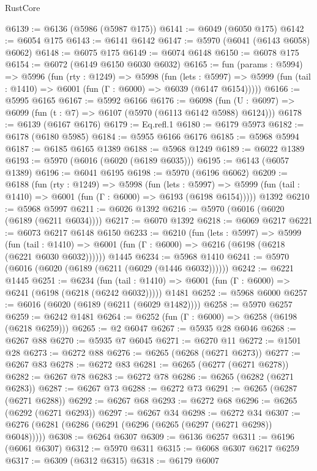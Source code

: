 \begin{lexlean}{RustCore}
\begin{coremodule}
@6139 := @6136 (@5986 (@5987 @175))
@6141 := @6049 (@6050 @175)
@6142 := @6054 @175
@6143 := @6141 @6142
@6147 := @5970 (@6041 (@6143 @6058) @6062)
@6148 := @6075 @175
@6149 := @6074 @6148
@6150 := @6078 @175
@6154 := @6072 (@6149 @6150 @6030 @6032)
@6165 := fun (params : @5994) =>
  @5996
    (fun (rty : @1249) =>
    @5998
      (fun (lets : @5997) =>
      @5999 (fun (tail : @1410) => @6001 (fun (Γ : @6000) => @6039 (@6147 @6154)))))
@6166 := @5995 @6165
@6167 := @5992 @6166
@6176 := @6098 (fun (U : @6097) => @6099 (fun (t : @7) => @6107 (@5970 (@6113 @6142 @5988) @6124)))
@6178 := @6139 (@6167 @6176)
@6179 := Eq.refl.{1}
@6180 := @6179 @5973
@6182 := @6178 (@6180 @5985)
@6184 := @5955 @6166 @6176
@6185 := @5968 @5994
@6187 := @6185 @6165 @1389
@6188 := @5968 @1249
@6189 := @6022 @1389
@6193 := @5970 (@6016 (@6020 (@6189 @6035)))
@6195 := @6143 (@6057 @1389)
@6196 := @6041 @6195
@6198 := @5970 (@6196 @6062)
@6209 := @6188
    (fun (rty : @1249) =>
    @5998
      (fun (lets : @5997) =>
      @5999 (fun (tail : @1410) => @6001 (fun (Γ : @6000) => @6193 (@6198 @6154)))))
    @1392
@6210 := @5968 @5997
@6211 := @6026 @1392
@6216 := @5970 (@6016 (@6020 (@6189 (@6211 @6034))))
@6217 := @6070 @1392
@6218 := @6069 @6217
@6221 := @6073 @6217 @6148 @6150
@6233 := @6210
    (fun (lets : @5997) =>
    @5999
      (fun (tail : @1410) => @6001 (fun (Γ : @6000) => @6216 (@6198 (@6218 (@6221 @6030 @6032))))))
    @1445
@6234 := @5968 @1410
@6241 := @5970 (@6016 (@6020 (@6189 (@6211 (@6029 (@1446 @6032))))))
@6242 := @6221 @1445
@6251 := @6234
    (fun (tail : @1410) => @6001 (fun (Γ : @6000) => @6241 (@6198 (@6218 (@6242 @6032)))))
    @1481
@6252 := @5968 @6000
@6257 := @6016 (@6020 (@6189 (@6211 (@6029 @1482))))
@6258 := @5970 @6257
@6259 := @6242 @1481
@6264 := @6252 (fun (Γ : @6000) => @6258 (@6198 (@6218 @6259)))
@6265 := @2 @6047
@6267 := @5935 @28 @6046
@6268 := @6267 @88
@6270 := @5935 @7 @6045
@6271 := @6270 @11
@6272 := @1501 @28
@6273 := @6272 @88
@6276 := @6265 (@6268 (@6271 @6273))
@6277 := @6267 @83
@6278 := @6272 @83
@6281 := @6265 (@6277 (@6271 @6278))
@6282 := @6267 @78
@6283 := @6272 @78
@6286 := @6265 (@6282 (@6271 @6283))
@6287 := @6267 @73
@6288 := @6272 @73
@6291 := @6265 (@6287 (@6271 @6288))
@6292 := @6267 @68
@6293 := @6272 @68
@6296 := @6265 (@6292 (@6271 @6293))
@6297 := @6267 @34
@6298 := @6272 @34
@6307 := @6276 (@6281 (@6286 (@6291 (@6296 (@6265 (@6297 (@6271 @6298)) @6048)))))
@6308 := @6264 @6307
@6309 := @6136 @6257
@6311 := @6196 (@6061 @6307)
@6312 := @5970 @6311
@6315 := @6068 @6307 @6217 @6259
@6317 := @6309 (@6312 @6315)
@6318 := @6179 @6007

\end{coremodule}
\end{lexlean}

